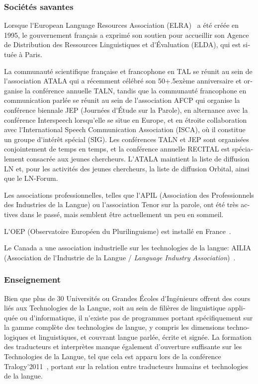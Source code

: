 \begin{french}
\begin{multicols}{2}
\subsubsection{Sociétés savantes}

Lorsque l{\mbox '}European Language Resources Association (ELRA)~\cite{elra} a été créée
en 1995, le gouvernement français a exprimé son soutien pour
accueillir son Agence de Distribution des Ressources Linguistiques et
d{\mbox '}Évaluation (ELDA), qui est située à Paris.

La communauté scientifique française et francophone en TAL se réunit
au sein de l{\mbox '}association ATALA qui a récemment célébré son
50\raise+.5ex\hbox{ème} anniversaire et organise la conférence
annuelle TALN, tandis que la communauté francophone en communication
parlée se réunit au sein de l{\mbox '}association AFCP qui organise la
conférence biennale JEP (Journées d{\mbox '}Étude sur la Parole), en
alternance avec la conférence Interspeech lorsqu{\mbox '}elle se situe en
Europe, et en étroite collaboration avec l{\mbox '}International Speech
Communication Association (ISCA), où il constitue un groupe d{\mbox '}intérêt
spécial (SIG). Les conférences TALN et JEP sont organisées
conjointement de temps en temps, et la conférence annuelle RECITAL est
spécialement consacrée aux jeunes chercheurs. L{\mbox '}ATALA maintient la
liste de diffusion LN et, pour les activités des jeunes chercheurs, la
liste de diffusion Orbital, ainsi que le LN-Forum.

Les associations professionnelles, telles que l{\mbox '}APIL (Association des
Professionnels des Industries de la Langue) ou l{\mbox '}association Tenor sur
la parole, ont été très actives dans le passé, mais semblent être
actuellement un peu en sommeil.

L{\mbox '}OEP (Observatoire Européen du Plurilinguisme) est installé en France~\cite{OEP}.

Le Canada a une association industrielle sur les technologies de la langue: AILIA
(Association de l{\mbox '}Industrie de la Langue / {\em Language Industry
Association})~\cite{ailia}.

\subsubsection{Enseignement}
Bien que plus de 30 Universités ou Grandes Écoles d{\mbox '}Ingénieurs
offrent des cours liés aux Technologies de la Langue, soit au sein de
filières de linguistique appliquée ou d{\mbox '}informatique, il
n{\mbox '}existe pas de programmes portant spécifiquement sur la gamme
complète des technologies de langue, y compris les dimensions
technologiques et linguistiques, et couvrant langue parlée, écrite et
signée. La formation des traducteurs et interprètes manque également
d'ouverture suffisante sur les Technologies de la Langue, tel que cela
est apparu lors de la conférence Tralogy{\mbox '}2011~\cite{tralogy},
portant sur la relation entre traducteurs humains et technologies de
la langue.


\end{multicols}
\end{french}
